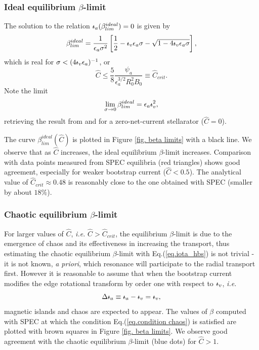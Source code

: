 \documentclass[my_thesis.tex]{subfiles}
\begin{document}
\subsubsection{Ideal equilibrium $\beta$-limit \label{sec. ideal limit}}
The solution to the relation $\text{$\iota\!\!$-}_a(\beta^{ideal}_{lim})=0$ is given by
\begin{align}
	\beta^{ideal}_{lim} = \frac{1}{\epsilon_a\sigma^2}\left[\frac{1}{2}-\text{$\iota\!\!$-}_v\epsilon_a\sigma - \sqrt{1-4\text{$\iota\!\!$-}_v\epsilon_a\sigma}\right], \label{eq.hbs ideal limit}
\end{align}
which is real for $\sigma<(4\text{$\iota\!\!$-}_v\epsilon_a)^{-1}$, or 
\begin{equation}
	\hat{C} \leq \frac{5}{8}\frac{\psi_a}{\epsilon_a^{3/2}R_0^2B_0} \equiv \hat{C}_{crit}. \label{eq.Ccrit analytical}
\end{equation}
Note the limit
\begin{equation}
	\lim_{\sigma\rightarrow 0}\beta^{ideal}_{lim} = \epsilon_a\text{$\iota\!\!$-}_v^2, \label{eq. beta limit C=0}
\end{equation}
retrieving the result from \citet{Freidberg2014} and \citet{Loizu2017} for a zero-net-current stellarator ($\hat C=0$).

The curve $\beta^{ideal}_{lim}(\hat{C})$ is plotted in Figure \ref{fig. beta limits} with a black line. We observe that as $\hat{C}$ increases, the ideal equilibrium $\beta$-limit increases. Comparison with data points measured from SPEC equilibria (red triangles) shows good agreement, especially for weaker bootstrap current ($\hat C<0.5$). The analytical value of $\hat{C}_{crit}\approx0.48$ is reasonably close to the one obtained with SPEC (smaller by about $18\%$).

	


\subsubsection{Chaotic equilibrium $\beta$-limit \label{sec. chaos limit}}
For larger values of $\hat C$, \textit{i.e.} $\hat{C}>\hat{C}_{crit}$, the equilibrium $\beta$-limit is due to the emergence of chaos and its effectiveness in increasing the transport, thus estimating the chaotic equilibrium $\beta$-limit with Eq.(\ref{eq.iota_hbs}) is not trivial - it is not known, \textit{a priori}, which resonance will participate to the radial transport first. However it is reasonable to assume that when the bootstrap current modifies the edge rotational transform by order one with respect to $\text{$\iota\!\!$-}_v$, \textit{i.e.}
\begin{equation}
	\Delta\iotabar_a\equiv\iotabar_a-\iotabar_v=\iotabar_v, \label{eq.condition chaos}
\end{equation}
magnetic islands and chaos are expected to appear. The values of $\beta$ computed with SPEC at which the condition Eq.(\ref{eq.condition chaos}) is satisfied are plotted with brown squares in Figure \ref{fig. beta limits}. We observe good agreement with the chaotic equilibrium $\beta$-limit (blue dots) for $\hat{C}>1$.
	
\end{document}
